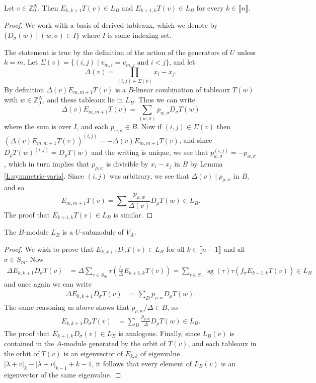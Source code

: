 \documentclass[11pt,fleqn]{article}
\newcommand\ZZ{\mathbb Z}
\renewcommand\ll{\llbracket}
\newcommand\rr{\rrbracket}
\DeclareMathOperator\sg{sg}
\begin{document}
\begin{Lemma}
Let $v\in \ZZ^N_0$. Then $E_{k,k+1} T(v) \in L_B$ and $E_{k+1,k}T(v) \in L_B$
for every $k \in \ll n \rr$.
\end{Lemma}
\begin{proof}
We work with a basis of derived tableaux, which we denote by $\{D_\sigma(w)
\mid (w, \sigma) \in I\}$ where $I$ is some indexing set.

The statement is true by the definition of the action of the generators of $U$
unless $k = m$. Let $\Sigma(v) = \{(i,j) \mid v_{m,i} = v_{m,j} \mbox{ and } 
i <j\}$, and let
\[
	\Delta(v) = \prod_{(i,j) \in \Sigma(v)} x_i - x_j.
\]
By definition $\Delta(v) E_{m,m+1} T(v)$ is a $B$-linear combination of 
tableaux $T(w)$ with $w \in \ZZ^N_0$, and these tableaux lie in $L_B$. Thus we 
can write
\[
\Delta(v) E_{m,m+1} T(v)
	= \sum_{(w,\sigma)} p_{w,\sigma} D_\sigma T(w)
\]
where the sum is over $I$, and each $p_{w, \sigma} \in B$. Now if $(i,j) \in 
\Sigma(v)$ then $(\Delta(v) E_{m,m+1} T(v))^{(i,j)}= - \Delta(v) E_{m,m+1} 
T(v)$, and since $D_\rho T(w)^{(i,j)} = D_\rho T(w)$ and the writing is 
unique, we see that $p_{w, \sigma}^{(i,j)} = - p_{w, \sigma}$, which in turn 
implies that $p_{\rho,w}$ is divisible by $x_i - x_j$ in $B$ by Lemma 
\ref{L:symmetric-varia}. Since $(i,j)$ was arbitrary, we see that $\Delta(v) 
\mid p_{\rho,w}$ in $B$, and so
\[
E_{m,m+1} T(v)
	= \sum \frac{p_{\rho, w}}{\Delta(v) } D_\rho T(w) \in L_B.
\]
The proof that $E_{k+1,k} T(v) \in L_B$ is similar.
\end{proof}


\begin{Proposition*}
The $B$-module $L_B$ is a $U$-submodule of $V_A$.
\end{Proposition*}
\begin{proof}
We wish to prove that $E_{k,k+1} D_\sigma T(v) \in L_B$ for all $k \in
\ll n-1 \rr$ and all $\sigma \in S_m$. Now
\begin{align*}
\Delta E_{k,k+1} D_\sigma T(v)
	&= \Delta \sum_{\tau \in S_m} \tau \left( 
		\frac{f_\sigma}{\Delta} E_{k+1,k} T(v)
	\right)
	= \sum_{\tau \in S_m} \sg(\tau) \tau \left( 
		f_\sigma E_{k+1,k} T(v)
			\right) \in L_B
\end{align*}
and once again we can write
\begin{align*}
\Delta E_{k,k+1} D_\sigma T(v)
	&= \sum_{D} p_{\rho, w} D_{\rho} T(w).
\end{align*}
The same reasoning as above shows that $p_{\rho,w}/\Delta \in B$, so
\begin{align*}
E_{k,k+1} D_\sigma T(v)
	&= \sum_{D} \frac{p_{\rho, w}}{\Delta} D_{\rho} T(w) \in L_B.
\end{align*}
The proof that $E_{k+1,k} D_\sigma (v) \in L_B$ is analogous. Finally,
since $L_B(v)$ is contained in the $A$-module generated by the orbit
of $T(v)$, and each tableaux in the orbit of $T(v)$ is an eigenvector of
$E_{k,k}$ of eigenvalue $|\lambda + v|_k - |\lambda + v|_{k-1} + k-1$, it 
follows that every element of $L_B(v)$ is an eigenvector of the same 
eigenvalue.
\end{proof}
\end{document}
